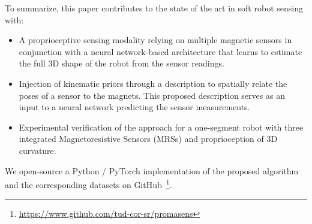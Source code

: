 To summarize, this paper contributes to the state of the art in soft robot sensing with:
%
\begin{itemize}
    \item A proprioceptive sensing modality relying on multiple magnetic sensors in conjunction with a neural network-based architecture that learns to estimate the full 3D shape of the robot from the sensor readings. %
    \item Injection of kinematic priors through a description to spatially relate the poses of a sensor to the magnets. This proposed description serves as an input to a neural network predicting the sensor measurements. %
    \item Experimental verification of the approach for a one-segment robot with three integrated Magnetoresistive Sensors (MRSs) and proprioception of 3D curvature.    %
\end{itemize}
We open-source a Python / PyTorch implementation of the proposed algorithm and the corresponding datasets on GitHub~\footnote{\url{https://www.github.com/tud-cor-sr/promasens}}.
